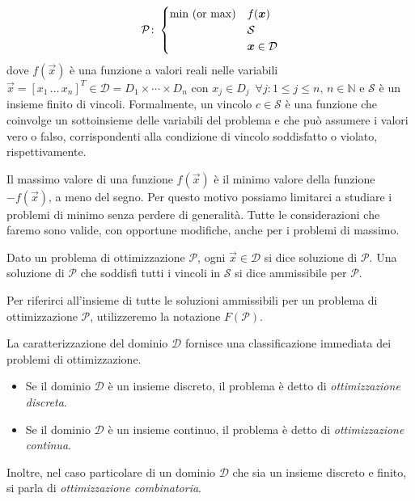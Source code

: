 \begin{equation}
    \mathcal{P}\colon
    \begin{cases}
        \text{$\min$ (or $\max$)} & f(\vec{x}) \\
                                  & \mathcal{S} \\
                                  & \vec{x} \in \mathcal{D}
    \end{cases}\\[10pt]
\end{equation}
dove $f(\vec{x})$ è una funzione a valori reali nelle variabili $\vec{x} =
[x_{1}\, \ldots \, x_{n}]^T \in \mathcal{D} = D_{1} \times
\cdots \times D_{n}$ con $x_{j} \in D_{j}\,\,\,\forall j\colon 1 \le j
\le n,\, n \in \mathbb{N}$ e $\mathcal{S}$ è un insieme finito di vincoli.
Formalmente, un vincolo $c \in \mathcal{S}$ è una funzione che coinvolge un
sottoinsieme delle variabili del problema e che può assumere i valori vero
o falso, corrispondenti alla condizione di vincolo soddisfatto o violato,
rispettivamente.

Il massimo valore di una funzione $f(\vec{x})$ è il minimo valore della
funzione $-f(\vec{x})$, a meno del segno. Per questo motivo possiamo
limitarci a studiare i problemi di minimo senza perdere di generalità.
Tutte le considerazioni che faremo sono valide, con opportune modifiche,
anche per i problemi di massimo.

\begin{definition}
Dato un problema di ottimizzazione $\mathcal{P}$, ogni $\vec{x} \in
\mathcal{D}$ si dice soluzione di $\mathcal{P}$. Una soluzione di
$\mathcal{P}$ che soddisfi tutti i vincoli in $\mathcal{S}$ si dice
ammissibile per $\mathcal{P}$.
\end{definition}
Per riferirci all'insieme di tutte le soluzioni ammissibili per un problema
di ottimizzazione $\mathcal{P}$, utilizzeremo la notazione
$F(\mathcal{P})$.

La caratterizzazione del dominio $\mathcal{D}$ fornisce una
classificazione immediata dei problemi di ottimizzazione.

\begin{itemize}
    \item Se il dominio $\mathcal{D}$ è un insieme discreto, il problema è
        detto di \textit{ottimizzazione discreta}.
    \item Se il dominio $\mathcal{D}$ è un insieme continuo, il problema è
        detto di \textit{ottimizzazione continua}.
\end{itemize}
Inoltre, nel caso particolare di un dominio $\mathcal{D}$ che sia un
insieme discreto e finito, si parla di \textit{ottimizzazione
combinatoria}.

